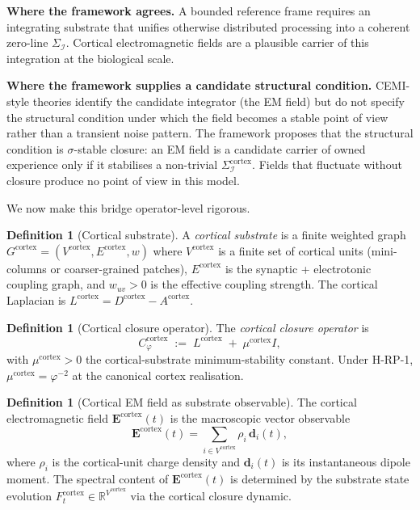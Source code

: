 \documentclass[11pt]{article}
\theoremstyle{plain}
\theoremstyle{definition}
\newtheorem{definition}[theorem]{Definition}
\theoremstyle{remark}
\newcommand{\Ical}{\mathcal{I}}
\newcommand{\Cph}{C_\varphi}
\begin{document}
\textbf{Where the framework agrees.} A bounded reference frame requires an integrating substrate that unifies otherwise distributed processing into a coherent zero-line $\Sigma_\Ical$. Cortical electromagnetic fields are a plausible carrier of this integration at the biological scale.

\textbf{Where the framework supplies a candidate structural condition.} CEMI-style theories identify the candidate integrator (the EM field) but do not specify the structural condition under which the field becomes a stable point of view rather than a transient noise pattern. The framework proposes that the structural condition is $\sigma$-stable closure: an EM field is a candidate carrier of owned experience only if it stabilises a non-trivial $\Sigma_\Ical^{\text{cortex}}$. Fields that fluctuate without closure produce no point of view in this model.

We now make this bridge operator-level rigorous.

\begin{definition}[Cortical substrate]\label{def:cortex-substrate}
A \emph{cortical substrate} is a finite weighted graph $G^{\mathrm{cortex}} = (V^{\mathrm{cortex}}, E^{\mathrm{cortex}}, w)$ where $V^{\mathrm{cortex}}$ is a finite set of cortical units (mini-columns or coarser-grained patches), $E^{\mathrm{cortex}}$ is the synaptic + electrotonic coupling graph, and $w_{uv} > 0$ is the effective coupling strength. The cortical Laplacian is $L^{\mathrm{cortex}} = D^{\mathrm{cortex}} - A^{\mathrm{cortex}}$.
\end{definition}

\begin{definition}[Cortical closure operator]\label{def:cph-cortex}
The \emph{cortical closure operator} is
\[
  \Cph^{\mathrm{cortex}} \;:=\; L^{\mathrm{cortex}} \;+\; \mu^{\mathrm{cortex}} I,
\]
with $\mu^{\mathrm{cortex}} > 0$ the cortical-substrate minimum-stability constant. Under H-RP-1, $\mu^{\mathrm{cortex}} = \varphi^{-2}$ at the canonical cortex realisation.
\end{definition}

\begin{definition}[Cortical EM field as substrate observable]\label{def:em-field}
The cortical electromagnetic field $\mathbf{E}^{\mathrm{cortex}}(t)$ is the macroscopic vector observable
\[
  \mathbf{E}^{\mathrm{cortex}}(t) = \sum_{i \in V^{\mathrm{cortex}}} \rho_i \, \mathbf{d}_i(t),
\]
where $\rho_i$ is the cortical-unit charge density and $\mathbf{d}_i(t)$ is its instantaneous dipole moment. The spectral content of $\mathbf{E}^{\mathrm{cortex}}(t)$ is determined by the substrate state evolution $F^{\mathrm{cortex}}_t \in \mathbb{R}^{V^{\mathrm{cortex}}}$ via the cortical closure dynamic.
\end{definition}
\end{document}
